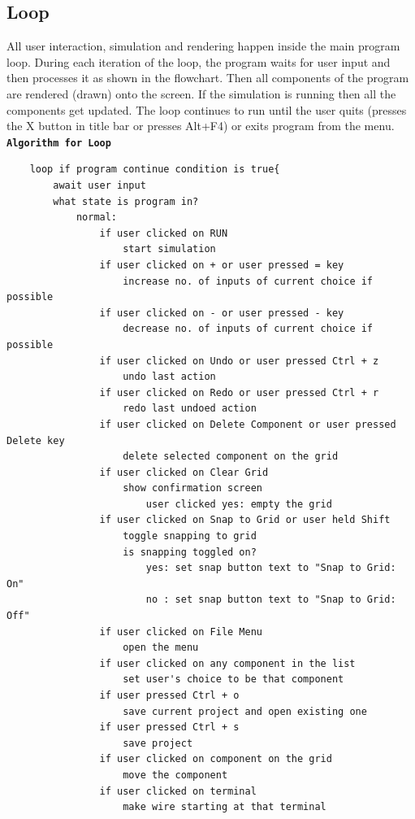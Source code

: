 \documentclass[report]{subfiles}
\begin{document}
    \subsection{Loop}
    All user interaction, simulation and rendering happen inside the main program loop. During each iteration of the loop, the program waits for user input and then processes it as shown in the flowchart. Then all components of the program are rendered (drawn) onto the screen. If the simulation is running then all the components get updated. The loop continues to run until the user quits (presses the X button in title bar or presses Alt+F4) or exits program from the menu.\\
        \textbf{\texttt{Algorithm for Loop}}
        \begin{verbatim}
    loop if program continue condition is true{
        await user input
        what state is program in?
            normal:
                if user clicked on RUN
                    start simulation
                if user clicked on + or user pressed = key
                    increase no. of inputs of current choice if possible
                if user clicked on - or user pressed - key
                    decrease no. of inputs of current choice if possible
                if user clicked on Undo or user pressed Ctrl + z
                    undo last action
                if user clicked on Redo or user pressed Ctrl + r
                    redo last undoed action
                if user clicked on Delete Component or user pressed Delete key
                    delete selected component on the grid
                if user clicked on Clear Grid
                    show confirmation screen
                        user clicked yes: empty the grid
                if user clicked on Snap to Grid or user held Shift
                    toggle snapping to grid
                    is snapping toggled on?
                        yes: set snap button text to "Snap to Grid: On"
                        no : set snap button text to "Snap to Grid: Off"
                if user clicked on File Menu
                    open the menu
                if user clicked on any component in the list
                    set user's choice to be that component
                if user pressed Ctrl + o
                    save current project and open existing one
                if user pressed Ctrl + s
                    save project
                if user clicked on component on the grid
                    move the component
                if user clicked on terminal
                    make wire starting at that terminal

\end{verbatim}
\end{document}
